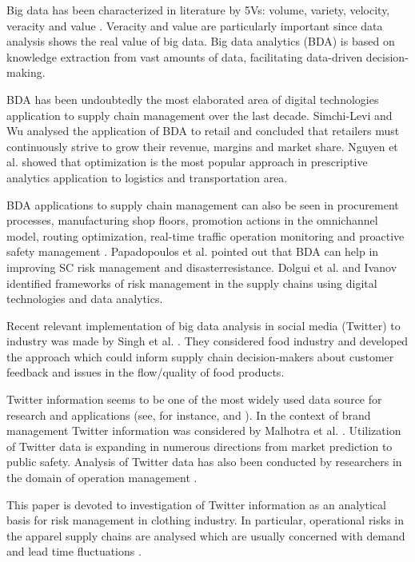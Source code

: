 Big data has been characterized in literature by 5Vs: volume, variety, velocity, veracity and value \cite{GunasekaranTiwariDubey}. Veracity and value are particularly important since data analysis shows the real value of big data. Big data analytics (BDA) is based on knowledge extraction from vast amounts of data, facilitating data-driven decision-making.

BDA has been undoubtedly the most elaborated area of digital technologies application to supply chain management over the last decade. Simchi-Levi and Wu \cite{SimchiLeviWu} analysed the application of BDA to retail and concluded that retailers must continuously strive to grow their revenue, margins and market share. Nguyen et al. \cite{NguyenZhouSpiegler} showed that optimization is the most popular approach in prescriptive analytics application to logistics and transportation area.

BDA applications to supply chain management can also be seen in procurement processes, manufacturing shop floors, promotion actions in the omnichannel model, routing optimization, real-time traffic operation monitoring and proactive safety management \cite{GunasekaranTiwariDubey,NguyenZhouSpiegler}. Papadopoulos et al. \cite{PapadopoulosGunasekaranDubey} pointed out that BDA can help in improving SC risk management and disasterresistance. Dolgui et al. \cite{DolguiIvanovSokolov} and Ivanov \cite{Ivanov} identified frameworks of risk management in the supply chains using digital technologies and data analytics.

Recent relevant implementation of big data analysis in social media (Twitter) to industry was made by Singh et al. \cite{SinghShuklaMishra}. They considered food industry and developed the approach which could inform supply chain decision-makers about customer feedback and issues in the flow/quality of food products.

Twitter information seems to be one of the most widely used data source for research and applications (see, for instance, \cite{ChenElmesChang} and \cite{BodrunovaLitvinenkoBlekanov}). In the context of brand management Twitter information was considered by Malhotra et al. \cite{MalhotraMalhotraSee}. Utilization of Twitter data is expanding in numerous directions from market prediction to public safety. Analysis of Twitter data has also been conducted by researchers in the domain of operation management \cite{TanZhanJi,FanNiu}.

This paper is devoted to investigation of Twitter information as an analytical basis for risk management in clothing industry. In particular, operational risks in the apparel supply chains are analysed which are usually concerned with demand and lead time fluctuations \cite{Ivanov,IvanovDolguiSokolov}.

